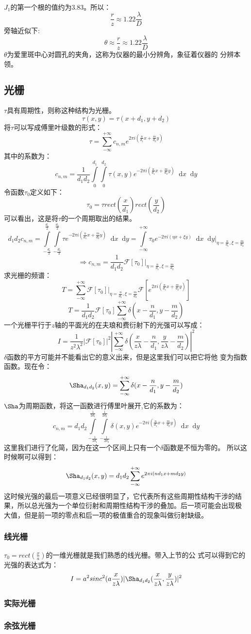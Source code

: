 \documentclass{article}
\newcommand*{\dif}{\mathop{}\!\mathrm{d}}
\begin{document}
\paragraph{}
$J_1$的第一个根的值约为3.83。所以：
\[\frac{r}{z}\approx 1.22 \frac{\lambda}{D}\]
旁轴近似下:
\[\theta\approx \frac{r}{z}\approx 1.22 \frac{\lambda}{D}\]
$\theta$为爱里斑中心对圆孔的夹角，这称为仪器的最小分辨角，象征着仪器的
分辨本领。
\subsection{光栅}
$\tau$具有周期性，则称这种结构为光栅。
\[\tau(x,y)=\tau(x+d_1,y+d_2)\]
将$\tau$可以写成傅里叶级数的形式：
\[\tau=\sum_{-\infty}^{+\infty}c_{n,m}e^{2\pi
    i(\frac{n}{d_1}x+\frac{m}{d_2}y)}\]
其中的系数为：
\[c_{n,m}=\frac{1}{d_1d_2}\int\limits_0^{d_1}\int\limits_0^{d_2}\tau(x,y)e^{-2\pi
    i(\frac{n}{d_1}x+\frac{m}{d_2}y)}\dif x\dif y\]
令函数$\tau_0$定义如下：
\[\tau_0=\tau rect(\frac{x}{d_1})rect(\frac{y}{d_2})\]
可以看出，这是将$\tau$的一个周期取出的结果。
\[d_1d_2c_{n,m}=\int\limits_{-\frac{d_1}{2}}^{\frac{d_1}{2}}\int\limits_{-\frac{d_2}{2}}^{\frac{d_2}{2}}\tau
  e^{-2\pi i(\frac{n}{d_1}x+\frac{m}{d_2}y)}\dif
  x\dif y=\int\limits_{-\infty}^{+\infty}\tau_0e^{-2\pi i(\eta x+\xi
    y)}\dif x\dif y|_{\eta=\frac{n}{d_1},\xi=\frac{m}{d_2}}\]
\[\Rightarrow
  c_{n,m}=\frac{1}{d_1d_2}\mathscr{F}[\tau_0]|_{\eta=\frac{n}{d_1},\xi=\frac{m}{d_2}}\]
求光栅的频谱：
\[T=\sum_{-\infty}^{+\infty}\mathscr{F}[\tau_0]|_{\eta=\frac{n}{d_1},\xi=\frac{m}{d_2}}\mathscr{F}[e^{2\pi
    i(\frac{n}{d_1}x+\frac{m}{d_2}y)}]\]
\begin{equation}
\label{eq:10}
T=\frac{1}{d_1d_2}\mathscr{F}[\tau_0]\sum_{-\infty}^{+\infty}\delta(x-\frac{n}{d_{1}},y-\frac{m}{d_2})
\end{equation}
一个光栅平行于$z$轴的平面光的在夫琅和费衍射下的光强可以写成：
\[I=\frac{1}{z^2\lambda^2}|\mathscr{F}[\tau_0]|^2|\sum_{-\infty}^{+\infty}\delta(\frac{x}{z\lambda}-\frac{n}{d_1},\frac{y}{z\lambda}-\frac{m}{d_2})|^2\]
$\delta$函数的平方可能并不能看出它的意义出来，但是这里我们可以把它将他
变为指数函数。现在令：
\[\Sha_{d_1d_2}(x,y)=\sum_{-\infty}^{+\infty}\delta(x-\frac{n}{d_1},y-\frac{m}{d_2})\]
$\Sha$为周期函数，将这一函数进行傅里叶展开,它的系数为：
\[c_{n,m}=d_1d_2
  \int\limits_{-\frac{1}{2d_1}}^{\frac{1}{2d_1}}\int\limits_{-\frac{1}{2d_2}}^{\frac{1}{2d_2}}\delta(x,y)e^{-2\pi
  i(\frac{n}{d_1}x+\frac{m}{d_2}y)}\dif
  x\dif y\]
这里我们进行了化简，因为在这一个区间上只有一个$\delta$函数是不恒为零的。
所以这时候啊可以得到：
\[\Sha_{d_1d_2}(x,y)=d_1d_2\sum_{-\infty}^{+\infty}e^{2\pi
    i(nd_1x+md_2y)}\]
这时候光强的最后一项意义已经很明显了，它代表所有这些周期性结构干涉的结
果，所以总光强为一个单位衍射和周期性结构干涉的叠加。后一项可能会出现极
大值，但是前一项的零点和后一项的极值重合的现象叫做衍射缺级。
\subsubsection{线光栅}
$\tau_0=rect(\frac{x}{a})$的一维光栅就是我们熟悉的线光栅。带入上节的公
式可以得到它的光强的表达式为：
\[I=a^2sinc^2(a \frac{x}{z\lambda})|\Sha_{d_1d_2}(\frac{x}{z\lambda},\frac{y}{z\lambda})|^2\]
\subsubsection{实际光栅}

\subsubsection{余弦光栅}
\end{document}
